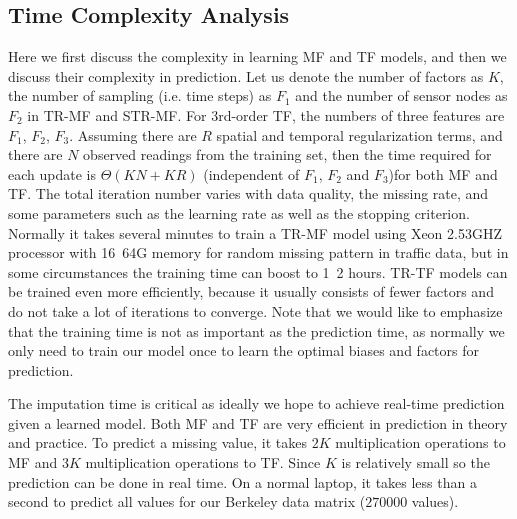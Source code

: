 \subsection{Time Complexity Analysis}
Here we first discuss the complexity in learning MF and TF models, and then we discuss their complexity in prediction.
Let us denote the number of factors as $K$, the number of sampling (i.e. time steps) as $F_1$ and the number of sensor nodes as $F_2$ in TR-MF and STR-MF. For 3rd-order TF, the numbers of three features are $F_1$, $F_2$, $F_3$.  
Assuming there are $R$ spatial and temporal regularization terms, and there are $N$ observed readings from the training set, then the time required for each update is $\Theta(KN + KR)$ (independent of $F_1$, $F_2$ and $F_3$)for both MF and TF.
The total iteration number varies with data quality, the missing rate, and some parameters such as the learning rate as well as the stopping criterion. Normally it takes several minutes to train a TR-MF model using Xeon 2.53GHZ processor with 16~64G memory for random missing pattern in traffic data, but in some circumstances the training time can boost to 1~2 hours. TR-TF models can be trained even more efficiently, because it usually consists of fewer factors and do not take a lot of iterations to converge. 
Note that we would like to emphasize that the training time is not as important as the prediction time, as normally we only need to train our model once to learn the optimal biases and factors for prediction.

The imputation time is critical as ideally we hope to achieve real-time prediction given a learned model. 
Both MF and TF are very efficient in prediction in theory and practice.
To predict a missing value, it takes $2K$ multiplication operations to MF and $3K$ multiplication operations to TF.
Since $K$ is relatively small so the prediction can be done in real time.
On a normal laptop, it takes less than a second to predict all values for our Berkeley data matrix ($270000$ values).

